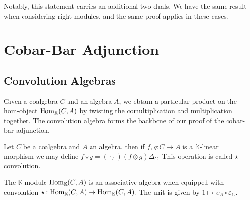 \documentclass[../thesis.tex]{subfiles}
\begin{document}
            Notably, this statement carries an additional two duals. We have the same result when considering right modules, and the same proof applies in these cases.
    \section{Cobar-Bar Adjunction}
    \subsection{Convolution Algebras}

            Given a coalgebra $C$ and an algebra $A$, we obtain a particular product on the hom-object $\tt{Hom}_\mathbb{K}(C, A)$ by twisting the comultiplication and multiplication together. The convolution algebra forms the backbone of our proof of the cobar-bar adjunction.

            Let $C$ be a coalgebra and $A$ an algebra, then if $f,g:C\rightarrow A$ is a $\mathbb{K}$-linear morphism we may define $f\star g = (\cdot_A)(f\otimes g)\Delta_C$. This operation is called $\star$ convolution.

            \begin{center}
            \end{center}

            \begin{proposition}
                The $\mathbb{K}$-module $\tt{Hom}_{\mathbb{K}}(C,A)$ is an associative algebra when equipped with convolution $\star:\tt{Hom}_{\mathbb{K}}(C,A)\rightarrow \tt{Hom}_{\mathbb{K}}(C,A)$. The unit is given by $1 \mapsto \upsilon_A\circ\varepsilon_C$.
            \end{proposition}
\end{document}
